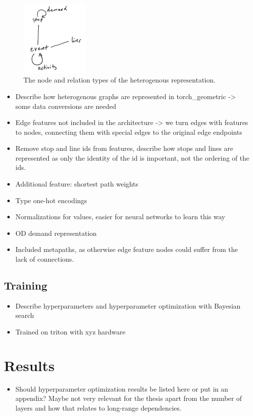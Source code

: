 \documentclass[english, 12pt, a4paper, sci, utf8, a-2b, online]{aaltothesis}
\begin{document}
\begin{figure}
    \centering
    \includegraphics[width=0.3\textwidth]{figures/hetero-graph-relations.png}
    \caption{The node and relation types of the heterogenous representation.}
    \label{fig:hetero-relations}
\end{figure}
\begin{itemize}
    \item Describe how heterogenous graphs are represented in torch\_geometric -> some data conversions are needed
    \item Edge features not included in the architecture -> we turn edges with features to nodes, connecting them with special edges to the original edge endpoints
    \item Remove stop and line ids from features, describe how stops and lines are represented as only the identity of the id is important, not the ordering of the ids.
    \item Additional feature: shortest path weights
    \item Type one-hot encodings
    \item Normalizations for values, easier for neural networks to learn this way
    \item OD demand representation
    \item Included metapaths, as otherwise edge feature nodes could suffer from the lack of connections.
\end{itemize}


\subsection{Training}
\begin{itemize}
    \item Describe hyperparameters and hyperparameter optimization with Bayesian search
    \item Trained on triton with xyz hardware
\end{itemize}
\clearpage
\section{Results}
\begin{itemize}
    \item Should hyperparameter optimization results be listed here or put in an appendix? Maybe not very relevant for the thesis apart from the number of layers and how that relates to long-range dependencies.
\end{itemize}
\end{document}
